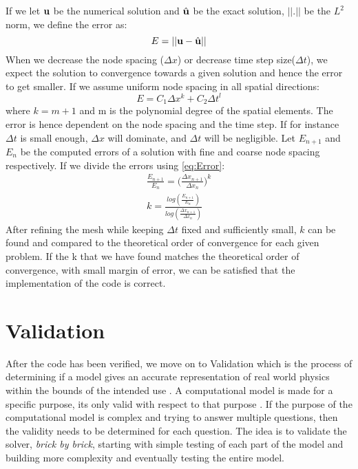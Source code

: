 If we let $\bold{u}$ be the numerical solution and $\hat{\bold{u}}$ be the exact solution, $|| . ||$ be the $L^2$ norm, we define the error as:
\begin{equation}
E = || \bold{u} - \hat{\bold{u}} ||
\end{equation}
When we decrease the node spacing ($ \Delta x $) or decrease time step size($\Delta t$), we expect the solution to convergence towards a given solution and hence the error to get smaller. If we assume uniform node spacing in all spatial directions: 
\begin{equation}
\label{eq:Error}
 E = C_1 \Delta x^k+ C_2 \Delta t^l 
\end{equation}
where $ k = m+1 $ and m is the polynomial degree of the spatial elements. The error is hence dependent on the node spacing and the time step.
If for instance $\Delta t$ is small enough, $\Delta x$ will dominate, and $\Delta t$ will be negligible. 
Let $E_{n+1}$ and $E_{n}$ be the computed errors of a solution with fine and coarse node spacing respectively.
If we divide the errors using \eqref{eq:Error}:
\begin{align}
\frac{E_{n+1}}{E_n} = \big( \frac{\Delta x_{n+1}}{\Delta x_n} \big)^k \\
k = \frac{log( \frac{E_{n+1}}{E_n}) }{ log(\frac{\Delta x_{n+1}}{\Delta x_n})}
\end{align}
After refining the mesh while keeping $\Delta t $ fixed and sufficiently small,
$k$ can be found and compared to the theoretical order of convergence for each given problem. If the k that we have found matches the theoretical order of convergence, with small margin of error, we can be satisfied that the implementation of the code is correct. \newline




\section{Validation}
After the code has been verified, we move on to Validation which is the process of determining if a model gives an accurate representation of real world physics within the bounds of the intended use \cite{Selin2014}. A computational model is made for a specific purpose, its only valid with respect to that purpose \cite{Macal2005}. If the purpose of the computational model is complex and trying to answer multiple questions, then the validity needs to be determined for each question. The idea is to validate the solver, \textsl{brick by brick}, starting with simple testing of each part of the model and building more complexity and eventually testing the entire model.\newline

